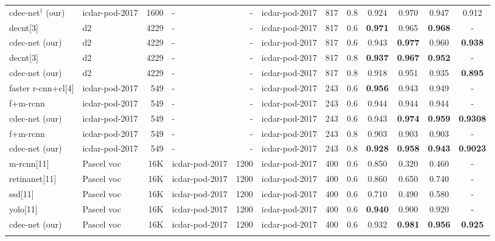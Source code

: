 \documentclass[a4paper,conference]{IEEEtran}
\begin{document}
\begin{table*}[ht!]
\begin{center}
\begin{tabular}{|l| l | r|l |r|l|r| c| c c c c|}
{\sc cd}e{\sc c-n}et$^{\dagger}$ (our) &{\sc icdar-pod}-2017 &1600 &- &- &{\sc icdar-pod}-2017 &817 &0.8 &0.924 &0.970 &0.947 &0.912 \\ \hhline{|=|=|=|=|=|=|=|=|====|} 
{\sc d}e{\sc cnt}[3] &{\sc d}2 &4229 &- &- &{\sc icdar-pod}-2017 &817 &0.6 &\textbf{0.971} &0.965 &\textbf{0.968} &- \\ 
{\sc cd}e{\sc c-n}et (our) &{\sc d}2 &4229 &- &- &{\sc icdar-pod}-2017 &817 &0.6 &0.943 &\textbf{0.977} &0.960 &\textbf{0.938} \\ \hhline{|=|=|=|=|=|=|=|=|====|}
{\sc d}e{\sc cnt}[3] &{\sc d}2 &4229 &- &- &{\sc icdar-pod}-2017 &817 &0.8 &\textbf{0.937} &\textbf{0.967} &\textbf{0.952} &- \\ 
{\sc cd}e{\sc c-n}et (our) &{\sc d}2 &4229 &- &- &{\sc icdar-pod}-2017 &817 &0.8 &0.918 &0.951	&0.935 & \textbf{0.895} \\ 
 \hhline{|=|=|=|=|=|=|=|=|====|}
{\sc f}aster {\sc r-cnn}+{\sc cl}[4] &{\sc icdar-pod}-2017 &549 &- &- &{\sc icdar-pod}-2017 &243 &0.6 &\textbf{0.956} &0.943 &0.949 &- \\ 
{\sc f+m-rcnn}~\cite{li2019gan} &{\sc icdar-pod}-2017 &549 &- &- &{\sc icdar-pod}-2017 &243 &0.6 &0.944 &0.944 &0.944 &- \\ 
{\sc cd}e{\sc c-n}et (our) &{\sc icdar-pod}-2017 &549 &- &- &{\sc icdar-pod}-2017 &243 &0.6 &0.943 & \textbf{0.974} & \textbf{0.959} & \textbf{0.9308} \\ \hhline{|=|=|=|=|=|=|=|=|====|}
{\sc f+m-rcnn}~\cite{li2019gan} &{\sc icdar-pod}-2017 &549 &- &- &{\sc icdar-pod}-2017 &243 &0.8 &0.903 &0.903 &0.903 &- \\ 
{\sc cd}e{\sc c-n}et (our) &{\sc icdar-pod}-2017 &549 &- &- &{\sc icdar-pod}-2017 &243 &0.8 &\textbf{0.928} & \textbf{0.958} & \textbf{0.943} & \textbf{0.9023} \\ \hhline{|=|=|=|=|=|=|=|=|====|}
{\sc m-rcnn}[11] &Pascel {\sc voc} &16K &{\sc icdar-pod}-2017 &1200 &{\sc icdar-pod}-2017 &400 &0.6 &0.850 &0.320 &0.460 &- \\
{\sc r}etina{\sc n}et[11] &Pascel {\sc voc} &16K &{\sc icdar-pod}-2017 &1200 &{\sc icdar-pod}-2017 &400 &0.6 &0.860 &0.650 &0.740 &- \\ 
{\sc ssd}[11] &Pascel {\sc voc} &16K &{\sc icdar-pod}-2017 &1200 &{\sc icdar-pod}-2017 &400 &0.6 &0.710 &0.490 &0.580 &- \\ 
{\sc yolo}[11] &Pascel {\sc voc} &16K &{\sc icdar-pod}-2017 &1200 &{\sc icdar-pod}-2017 &400 &0.6 &\textbf{0.940} &0.900 &0.920 &- \\     
{\sc cd}e{\sc c-n}et (our) &Pascel {\sc voc} &16K &{\sc icdar-pod}-2017 &1200 &{\sc icdar-pod}-2017 &400 &0.6 & 0.932 &\textbf{0.981} &\textbf{0.956} &\textbf{0.925} \\ \hhline{|=|=|=|=|=|=|=|=|====|} 

\end{tabular}
\end{center}
\end{table*}
\end{document}
